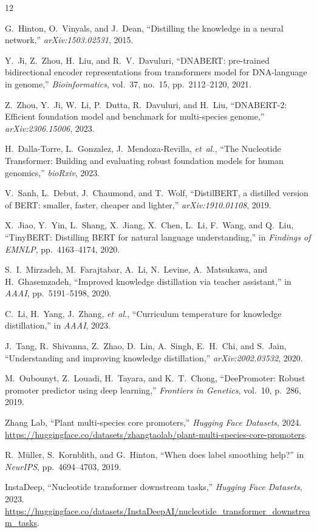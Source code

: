 \documentclass[conference]{IEEEtran}
\begin{document}

\begin{thebibliography}{12}

G.~Hinton, O.~Vinyals, and J.~Dean,
``Distilling the knowledge in a neural network,''
\emph{arXiv:1503.02531}, 2015.

Y.~Ji, Z.~Zhou, H.~Liu, and R.~V.~Davuluri,
``{DNABERT}: pre-trained bidirectional encoder representations from transformers model for {DNA}-language in genome,''
\emph{Bioinformatics}, vol.~37, no.~15, pp.~2112--2120, 2021.

Z.~Zhou, Y.~Ji, W.~Li, P.~Dutta, R.~Davuluri, and H.~Liu,
``{DNABERT-2}: Efficient foundation model and benchmark for multi-species genome,''
\emph{arXiv:2306.15006}, 2023.

H.~Dalla-Torre, L.~Gonzalez, J.~Mendoza-Revilla, \emph{et~al.},
``The {Nucleotide Transformer}: Building and evaluating robust foundation models for human genomics,''
\emph{bioRxiv}, 2023.

V.~Sanh, L.~Debut, J.~Chaumond, and T.~Wolf,
``{DistilBERT}, a distilled version of {BERT}: smaller, faster, cheaper and lighter,''
\emph{arXiv:1910.01108}, 2019.

X.~Jiao, Y.~Yin, L.~Shang, X.~Jiang, X.~Chen, L.~Li, F.~Wang, and Q.~Liu,
``{TinyBERT}: Distilling {BERT} for natural language understanding,''
in \emph{Findings of EMNLP}, pp.~4163--4174, 2020.

S.~I.~Mirzadeh, M.~Farajtabar, A.~Li, N.~Levine, A.~Matsukawa, and H.~Ghasemzadeh,
``Improved knowledge distillation via teacher assistant,''
in \emph{AAAI}, pp.~5191--5198, 2020.

C.~Li, H.~Yang, J.~Zhang, \emph{et~al.},
``Curriculum temperature for knowledge distillation,''
in \emph{AAAI}, 2023.

J.~Tang, R.~Shivanna, Z.~Zhao, D.~Lin, A.~Singh, E.~H.~Chi, and S.~Jain,
``Understanding and improving knowledge distillation,''
\emph{arXiv:2002.03532}, 2020.

M.~Oubounyt, Z.~Louadi, H.~Tayara, and K.~T.~Chong,
``{DeePromoter}: Robust promoter predictor using deep learning,''
\emph{Frontiers in Genetics}, vol.~10, p.~286, 2019.

{Zhang Lab},
``Plant multi-species core promoters,''
\emph{Hugging Face Datasets}, 2024.
\url{https://huggingface.co/datasets/zhangtaolab/plant-multi-species-core-promoters}.

R.~M{\"u}ller, S.~Kornblith, and G.~Hinton,
``When does label smoothing help?''
in \emph{NeurIPS}, pp.~4694--4703, 2019.

{InstaDeep},
``Nucleotide transformer downstream tasks,''
\emph{Hugging Face Datasets}, 2023.
\url{https://huggingface.co/datasets/InstaDeepAI/nucleotide_transformer_downstream_tasks}.

\end{thebibliography}

\balance
\end{document}
